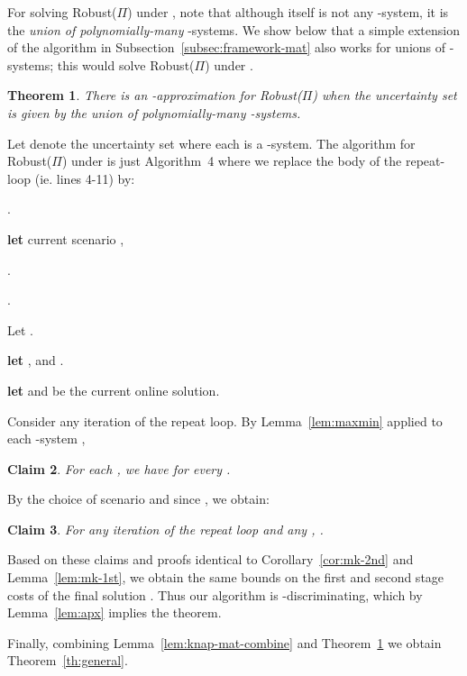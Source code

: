 \documentclass[11pt,letterpaper]{article}
\newcommand{\ignore}[1]{}
\newcommand{\lref}[2][]{\hyperref[#2]{#1~\ref*{#2}}}
\newtheorem{theorem}{Theorem}[section]
\newtheorem{claim}[theorem]{Claim}
\newenvironment{proof}{

\noindent{\bf Proof:}} {\hfill


}
\def\cov{\ensuremath{\Pi}\xspace}
\def\rcov{{\sf Robust(\cov)}\xspace}
\newcounter{note}[section]
\begin{document}
For solving \rcov under , note that although  itself is not any -system, it is the {\em union  of
polynomially-many} -systems. We show below that a simple extension of the algorithm in
Subsection~\ref{subsec:framework-mat} also works for unions of -systems; this would solve \rcov under .
\begin{theorem}\label{th:p-sets-union}
There is an -approximation for \rcov when the uncertainty set is given by the  union of
polynomially-many -systems.
\end{theorem}
\begin{proof}
Let  denote the uncertainty set where each  is a -system. The algorithm for
\rcov under  is just Algorithm~4 where we replace the body of the repeat-loop (ie. lines 4-11) by:
  \begin{algorithmic}[1]
   .

  \FOR{()}

  \STATE \textbf{let} current scenario ,


    \STATE .

    \STATE  .

    \ENDWHILE
 \STATE Let .

 \ENDFOR

    \STATE \textbf{let} , and .

    \STATE \textbf{let}  and   be the current online solution.
\end{algorithmic}

Consider any iteration  of the repeat loop. By Lemma~\ref{lem:maxmin} applied to each -system ,
\begin{claim}
For each , we have  for every .
\end{claim}
By the choice of scenario  and since , we obtain:
\begin{claim}
For any iteration  of the repeat loop and any , .
\end{claim}
Based on these claims and proofs identical to Corollary~\ref{cor:mk-2nd} and Lemma~\ref{lem:mk-1st}, we obtain the same
bounds on the first and second stage costs of the final solution . Thus our algorithm is -discriminating, which by Lemma~\ref{lem:apx} implies the theorem.
\end{proof}

Finally, combining Lemma~\ref{lem:knap-mat-combine} and Theorem~\ref{th:p-sets-union} we obtain
Theorem~\ref{th:general}.


\ignore{Using subadditivity, we can reduce the  knapsack constraints to just one knapsack (with ), at the loss of a
factor  in the objective value of the robust problem. Furthermore, using \lref[Lemma]{lem:knap-to-mat}, one can
reduce (in  time) this knapsack constraint to a partition matroid; this reduction loses an additional 
factor in the objective value. Hence the original uncertainty set with  knapsack and  matroid constraints reduces
to one having  matroid constraints, at the loss of an  factor. Finally we can use the algorithm for the
matroid-constrained case from the previous subsection, to obtain an 
approximation for robust covering under matroid and knapsack constraints. This completes the proof of
\lref[Theorem]{th:general}.}
\end{document}
